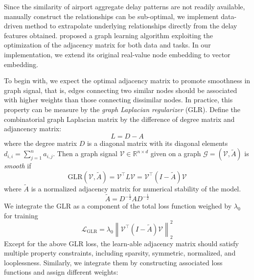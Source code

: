 Since the similarity of airport aggregate delay patterns are not readily available, manually construct the relationships can be sub-optimal, we implement data-driven method to extrapolate underlying relationships directly from the delay features obtained. \citet{9102726} proposed a graph learning algorithm exploiting the optimization of the adjacency matrix for both data and tasks. In our implementation, we extend its original real-value node embedding to vector embedding.

To begin with, we expect the optimal adjacency matrix to promote smoothness in graph signal, that is, edges connecting two similar nodes should be associated with higher weights than those connecting dissimilar nodes. In practice, this property can be measure by the \emph{graph Laplacian regularizer} (GLR). Define the combinatorial graph Laplacian matrix by the difference of degree matrix and adjancency matrix\citep{chung1997spectral}:
\begin{equation}
    L=D-A
\end{equation}
where the degree matrix $D$ is a diagonal matrix with its diagonal elements $d_{i,i}=\sum_{j=1}^n a_{i,j}$. Then a graph signal $\mathcal{V}\in\mathbb{R}^{n\times d}$ given on a graph $\mathcal{G}=(\mathcal{V},\tilde{A})$ is \emph{smooth} if
\begin{equation}
    \text{GLR}(\mathcal{V},\tilde{A})=\mathcal{V}^\intercal L\mathcal{V}=\mathcal{V}^\intercal\left(I-\tilde{A}\right)\mathcal{V}
\end{equation}
where $\tilde{A}$ is a normalized adjacency matrix for numerical stability of the model.
\begin{equation}
    \tilde{A}=D^{-\frac{1}{2}}AD^{-\frac{1}{2}}
\end{equation}
We integrate the GLR as a component of the total loss function weighed by $\lambda_0$ for training
\begin{equation}
    \mathcal{L}_{\text{GLR}}=\lambda_0\left\|\mathcal{V}^\intercal\left(I-\tilde{A}\right)\mathcal{V}\right\|_2^2
\end{equation}
Except for the above GLR loss, the learn-able adjacency matrix should satisfy multiple property constraints, including sparsity, symmetric, normalized, and looplessness. Similarly, we integrate them by constructing associated loss functions and assign different weights:
